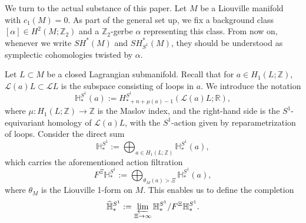 \documentclass[a4paper]{article}
\numberwithin{equation}{section}
\begin{document}
We turn to the actual substance of this paper. Let $M$ be a Liouville manifold with $c_1(M)=0$. As part of the general set up, we fix a background class $[\alpha]\in H^2(M;\mathbb{Z}_2)$ and a $\mathbb{Z}_2$-gerbe $\alpha$ representing this class. From now on, whenever we write $\mathit{SH}^\ast(M)$ and $\mathit{SH}_{S^1}^\ast(M)$, they should be understood as symplectic cohomologies twisted by $\alpha$.

Let $L\subset M$ be a closed Lagrangian submanifold. Recall that for $a\in H_1(L;\mathbb{Z})$, $\mathcal{L}(a)L\subset\mathcal{L}L$ is the subspace consisting of loops in $a$. We introduce the notation
\begin{equation}\label{eq:StrH}
\mathbb{H}^{S^1}_\ast(a):=H_{\ast+n+\mu(a)-1}^{S^1}(\mathcal{L}(a)L;\mathbb{R}),
\end{equation}
where $\mu:H_1(L;\mathbb{Z})\rightarrow\mathbb{Z}$ is the Maslov index, and the right-hand side is the $S^1$-equivariant homology of $\mathcal{L}(a)L$, with the $S^1$-action given by reparametrization of loops. Consider the direct sum
\begin{equation}\label{eq:H-eq}
\mathbb{H}_\ast^{S^1}:=\bigoplus_{a\in H_1(L;\mathbb{Z})}\mathbb{H}^{S^1}_\ast(a),
\end{equation}
which carries the aforementioned action filtration
\begin{equation}
F^\Xi\mathbb{H}_\ast^{S^1}:=\bigoplus_{\theta_M(a)>\Xi}\mathbb{H}^{S^1}_\ast(a),
\end{equation}
where $\theta_M$ is the Liouville 1-form on $M$. This enables us to define the completion
\begin{equation}\label{eq:H-c}
\widehat{\mathbb{H}}_\ast^{S^1}:=\varprojlim_{\Xi\rightarrow\infty}\mathbb{H}_\ast^{S^1}/F^\Xi\mathbb{H}_\ast^{S^1}.
\end{equation}
\end{document}
